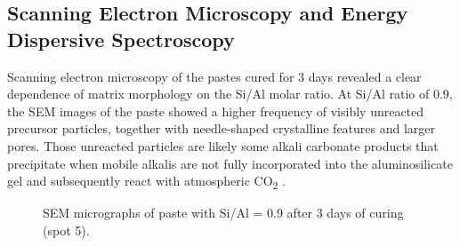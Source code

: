 \subsection{Scanning Electron Microscopy and Energy Dispersive Spectroscopy}

Scanning electron microscopy of the pastes cured for 3 days revealed a clear dependence of matrix morphology on the Si/Al molar ratio.
At Si/Al ratio of 0.9, the SEM images of the paste showed a higher frequency of visibly unreacted precursor particles, together with needle-shaped crystalline features and larger pores. Those unreacted particles are likely some alkali carbonate products that precipitate when mobile alkalis are not fully incorporated into the aluminosilicate gel and subsequently react with atmospheric CO\textsubscript{2} \cite{provis2018alkali}.

\begin{figure}[H]
  \centering
  \caption{SEM micrographs of paste with Si/Al = 0.9 after 3 days of curing (spot 5).}
  \label{fig:si_al_0-9_spot5}
\end{figure}

